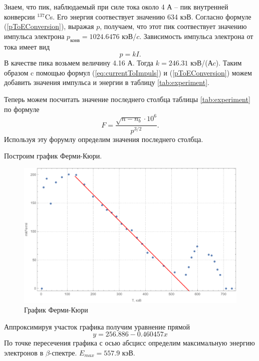 \documentclass[a4paper, 12pt]{article}
\begin{document}
		\par
		Знаем, что пик, наблюдаемый при силе тока около 4 А -- пик внутренней конверсии $^{137}$Cs. Его энергия соотвествует значению 634 кэВ. Согласно формуле (\ref{pToEConversion}), выражая $p$, получаем, что этот пик соотвествует значению импульса электрона $p_{\text{конв}}=1024.6476$ кэВ/$c$. Зависимость импульса электрона от тока имеет вид
		\begin{equation}
			\label{eq:currentToImpuls}
			p=kI.
		\end{equation}
		В качестве пика возьмем величину 4.16 А. Тогда $k=246.31$ кэВ/(А$c$). Таким образом c помощью формул (\ref{eq:currentToImpuls}) и (\ref{pToEConversion}) можем добавить значения импульса и энергии в таблицу \ref{tab:experiment}.\par
		Теперь можем посчитать значение последнего столбца таблицы \ref{tab:experiment} по формуле
		\begin{equation}
			F=\frac{\sqrt{n-n_b}\cdot 10^6}{p^{3/2}}.
		\end{equation}			
		Используя эту форумлу определим значения последнего столбца.\par
		Построим график Ферми-Кюри.
		\newpage
		\begin{figure}[!htb]
			\centering
			\includegraphics[width=\textwidth]{Fermi-Curie.pdf}
			\caption{График Ферми-Кюри}	
		\end{figure}
		\par
		Аппроксимируя участок графика получим уравнение прямой
		\begin{equation*}
			y=256.886-0.460457x
		\end{equation*}
		По точке пересечения графика с осью абсцисс определим максимальную энергию электронов в $\beta$-спектре. 
$E_{max} = 557.9$ кэВ.
\end{document}
